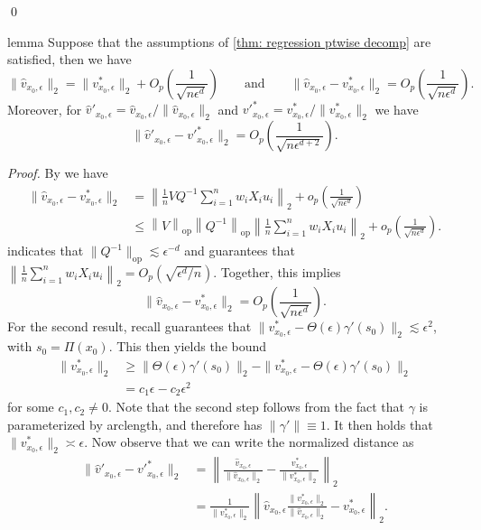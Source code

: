 \documentclass[11pt]{article}
\begin{document}
\qed{}

\begin{restatable}{lemma}{} \label{lemma: scaled high prob bound for velocity}
    Suppose that the assumptions of \cref{thm: regression ptwise decomp} are satisfied, then we have 
    \[\|\hat{v}_{x_0, \epsilon}\|_2  = \|v^*_{x_0, \epsilon}\|_2 + O_p\left(\frac{1}{\sqrt{n\epsilon^d}}\right) \qquad \text{and} \qquad \|\hat{v}_{x_0, \epsilon} - v^*_{x_0, \epsilon}\|_2 = O_p\left(\frac{1}{\sqrt{n\epsilon^d}}\right).\]
    Moreover, for $\hat{v}'_{x_0, \epsilon} = \hat{v}_{x_0, \epsilon}/\|\hat{v}_{x_0, \epsilon}\|_2$ and $v'^*_{x_0, \epsilon} = v^*_{x_0, \epsilon}/\|v^*_{x_0, \epsilon}\|_2$ we have
    \[\|\hat{v}'_{x_0, \epsilon} - v'^*_{x_0, \epsilon}\|_2 = O_p\left(\frac{1}{\sqrt{n\epsilon^{d+2}}}\right).\]
\end{restatable}
\noindent \textit{Proof.} By  we have
\begin{align*}
\|\hat{v}_{x_0, \epsilon} - v^*_{x_0, \epsilon}\|_2 &= \left\|\frac{1}{n}VQ^{-1}\sum_{i = 1}^nw_iX_iu_i\right\|_2 +o_p\left(\frac{1}{\sqrt{n\epsilon^{d}}}\right) \\
&\leq \left\|V\right\|_{\text{op}}\left\|Q^{-1}\right\|_{\text{op}}\left\|\frac{1}{n}\sum_{i = 1}^nw_iX_iu_i\right\|_2+o_p\left(\frac{1}{\sqrt{n\epsilon^{d}}}\right).
\end{align*}
 indicates that $\|Q^{-1}\|_{\text{op}}\lesssim \epsilon^{-d}$ and  guarantees that $\left\|\frac{1}{n}\sum_{i = 1}^nw_iX_iu_i\right\|_2 = O_p(\sqrt{\epsilon^d/n})$. Together, this implies
\[\|\hat{v}_{x_0, \epsilon} - v^*_{x_0, \epsilon}\|_2 = O_p\left(\frac{1}{\sqrt{n\epsilon^d}}\right).\]
For the second result, recall  guarantees that $\|v^*_{x_0, \epsilon} - \Theta(\epsilon)\gamma'(s_0)\|_2 \lesssim \epsilon^2$, with $s_0 = \Pi(x_0)$. This then yields the bound
\begin{align*}
    \|v^*_{x_0, \epsilon}\|_2 &\geq \|\Theta(\epsilon)\gamma'(s_0)\|_2 - \|v^*_{x_0, \epsilon} - \Theta(\epsilon)\gamma'(s_0)\|_2 \\
    &= c_1\epsilon - c_2\epsilon^2
\end{align*}
for some $c_1, c_2 \neq 0$. Note that the second step follows from the fact that $\gamma$ is parameterized by arclength, and therefore has $\|\gamma'\| \equiv 1$. It then holds that $\|v^*_{x_0, \epsilon}\|_2 \asymp \epsilon$. Now observe that we can write the normalized distance as 
\begin{align*}
    \|\hat{v}'_{x_0, \epsilon} - v'^*_{x_0, \epsilon}\|_2 &= \left\|\frac{\hat{v}_{x_0, \epsilon}}{\|\hat{v}_{x_0, \epsilon}\|_2} - \frac{v^*_{x_0, \epsilon}}{\|v^*_{x_0, \epsilon}\|_2}\right\|_2 \\
    &= \frac{1}{\|v^*_{x_0, \epsilon}\|_2}\left\|\hat{v}_{x_0, \epsilon}\frac{\|v^*_{x_0, \epsilon}\|_2}{\|\hat{v}_{x_0, \epsilon}\|_2} - v^*_{x_0, \epsilon}\right\|_2.
\end{align*}
\end{document}
